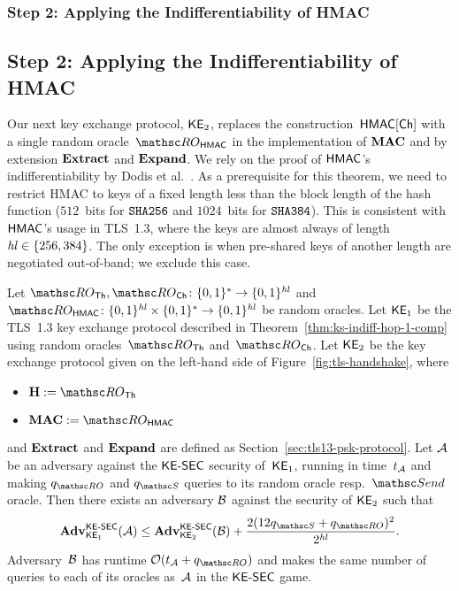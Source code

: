 \def\StepTwoTitle{Step 2: Applying the Indifferentiability of HMAC}
\iffull
	\subsubsection{\StepTwoTitle}
\else
	 \subsection{\StepTwoTitle}
\fi

\label{sec:hmac}
Our next key exchange protocol, $\mathsf{KE}_2$, replaces the construction~$\mathsf{HMAC}[\mathsf{Ch}]$ with a single random oracle~$\ROhmac$ in the implementation of $\mathbf{MAC}$ and by extension $\mathbf{Extract}$ and $\mathbf{Expand}$.
We rely on the proof of $\mathsf{HMAC}$'s indifferentiability by Dodis et al.~\cite[Theorem~3]{C:DRST12}.
As a prerequisite for this theorem, we need to restrict HMAC to keys of a fixed length less than the block length of the hash function ($512$~bits for $\texttt{SHA{256}}$ and $1024$~bits for $\texttt{SHA{384}}$).
This is consistent with $\mathsf{HMAC}$'s usage in TLS~1.3, where the keys are almost always of length~$\mathit{hl} \in \{256, 384\}$.
The only exception is when pre-shared keys of another length are negotiated out-of-band; we exclude this case.
\begin{lemma}
	\label{thm:ks-indiff-hop-2-comp}
	Let $\ROthash, \ROchash \colon \bits^* \to \bits^{\hashlen}$ and $\ROhmac \colon \bits^{\hashlen} \times \bits^* \to \bits^{\hashlen}$ be random oracles.
	Let $\mathsf{KE}_1$ be the TLS~1.3 key exchange protocol described in Theorem~\ref{thm:ks-indiff-hop-1-comp} using random oracles~$\ROthash$ and~$\ROchash$.
	Let $\mathsf{KE}_2$ be the key exchange protocol given on the left-hand side of  Figure~\ref{fig:tls-handshake}, where
	\begin{itemize}
		\item $\abstractHash := \ROthash$
		\item $\abstractMAC := \ROhmac$
	\end{itemize}
	and $\mathbf{Extract}$ and $\mathbf{Expand}$ are defined as Section~\ref{sec:tls13-psk-protocol}.
	Let $\mathcal{A}$ be an adversary against the $\mathsf{KE{\text{\normalfont-}}SEC}$ security of~$\mathsf{KE}_1$, running in time~$t_{\mathcal{A}}$ and making $\qRO$ and $\qSend$ queries to its random oracle resp.\ $\Send$ oracle.
	Then there exists an adversary $\mathcal{B}$ against the security of $\mathsf{KE}_2$ such that 
	\[
	\genAdv{\KESEC}{\KE_1}{\advA}
	\leq \genAdv{\KESEC}{\KE_2}{\advB} + \frac{2(12\qSend+\qRO)^2}{2^{\hashlen}}.
	\]
	Adversary~$\mathcal{B}$ has runtime $\bigO(t_{\advA} + \qRO)$ and makes the same number of queries to each of its oracles as~$\mathcal{A}$ in the $\mathsf{KE{\text{\normalfont-}}SEC}$ game.
\end{lemma}
